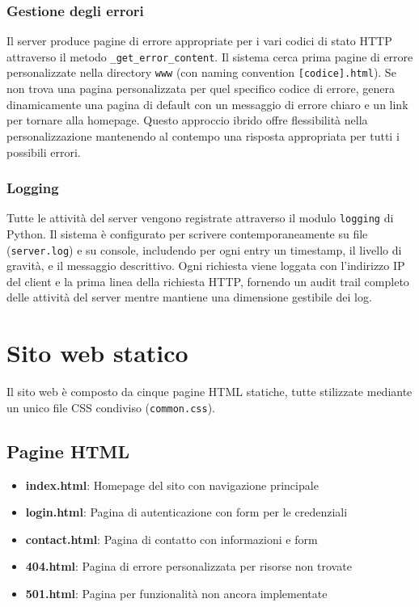 \documentclass[a4paper,12pt]{report}
\begin{document}
\subsection{Gestione degli errori}
Il server produce pagine di errore appropriate per i vari codici di stato HTTP attraverso il metodo \texttt{\_get\_error\_content}. Il sistema cerca prima pagine di errore personalizzate nella directory \texttt{www} (con naming convention \texttt{[codice].html}). Se non trova una pagina personalizzata per quel specifico codice di errore, genera dinamicamente una pagina di default con un messaggio di errore chiaro e un link per tornare alla homepage. Questo approccio ibrido offre flessibilità nella personalizzazione mantenendo al contempo una risposta appropriata per tutti i possibili errori.

\subsection{Logging}
Tutte le attività del server vengono registrate attraverso il modulo \texttt{logging} di Python. Il sistema è configurato per scrivere contemporaneamente su file (\texttt{server.log}) e su console, includendo per ogni entry un timestamp, il livello di gravità, e il messaggio descrittivo. Ogni richiesta viene loggata con l'indirizzo IP del client e la prima linea della richiesta HTTP, fornendo un audit trail completo delle attività del server mentre mantiene una dimensione gestibile dei log.

\chapter{Sito web statico}

Il sito web è composto da cinque pagine HTML statiche, tutte stilizzate mediante un unico file CSS condiviso (\texttt{common.css}).

\section{Pagine HTML}

\begin{itemize}
    \item \textbf{index.html}: Homepage del sito con navigazione principale
    \item \textbf{login.html}: Pagina di autenticazione con form per le credenziali
    \item \textbf{contact.html}: Pagina di contatto con informazioni e form
    \item \textbf{404.html}: Pagina di errore personalizzata per risorse non trovate
    \item \textbf{501.html}: Pagina per funzionalità non ancora implementate
\end{itemize}
\end{document}
